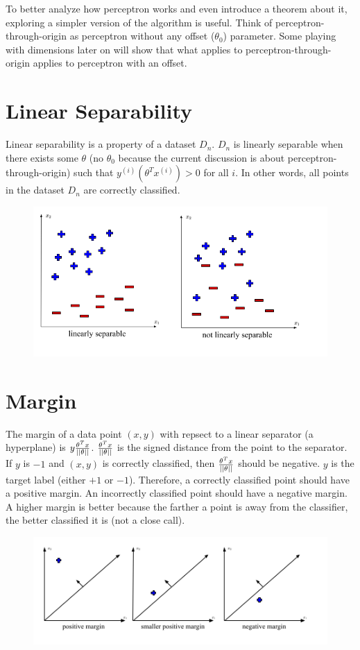 \documentclass{article}
\begin{document}
    To better analyze how perceptron works and even introduce a theorem about it, exploring a simpler version of the algorithm is useful. Think of perceptron-through-origin as perceptron without any offset ($\theta_0$) parameter. Some playing with dimensions later on will show that what applies to perceptron-through-origin applies to perceptron with an offset. 

    \section{Linear Separability}
    Linear separability is a property of a dataset $D_n$. $D_n$ is linearly separable when there exists some $\theta$ (no $\theta_0$ because the current discussion is about perceptron-through-origin) such that $y^{(i)}(\theta^Tx^{(i)})>0$ for all $i$. In other words, all points in the dataset $D_n$ are correctly classified. 

    \begin{figure}[H]
        \centering
        \includegraphics[width=0.5\linewidth]{Linear Separability.png}
    \end{figure}

    \section{Margin}
    The margin of a data point $(x,y)$ with repsect to a linear separator (a hyperplane) is $y{{\theta^Tx}\over{||\theta||}}$. ${\theta^Tx}\over{||\theta||}$ is the signed distance from the point to the separator. If $y$ is $-1$ and $(x,y)$ is correctly classified, then ${\theta^Tx}\over{||\theta||}$ should be negative. $y$ is the target label (either $+1$ or $-1$). Therefore, a correctly classified point should have a positive margin. An incorrectly classified point should have a negative margin. A higher margin is better because the farther a point is away from the classifier, the better classified it is (not a close call). 

    \begin{figure}[H]
        \centering
        \includegraphics[width=0.5\linewidth]{Margin of a Point.png}
    \end{figure}
\end{document}
